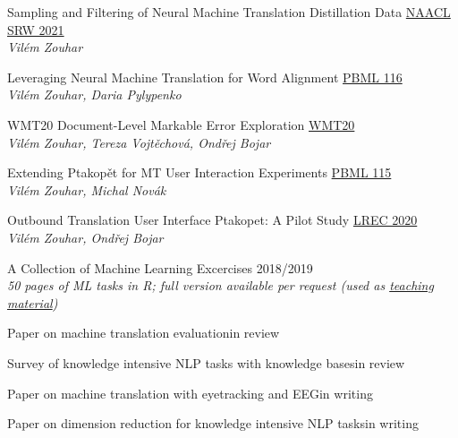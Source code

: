 \documentclass[11pt,a4paper]{article} %
\newcommand{\hSubsectionA}[2]{{#1}\hfill {#2}\hspace{-1cm}}
\newcommand{\hSubsectionB}[3]{
    {#1} \hfill {\footnotesize #2}\hspace{-1cm}\\
    \vspace{-0.2cm} \hspace{-0.17cm}\textit{\footnotesize #3}
    \vspace{0.1cm}
}
\begin{document}
\hSubsectionB
{Sampling and Filtering of Neural Machine Translation Distillation Data}
{\href{https://arxiv.org/pdf/2104.00664.pdf}{NAACL SRW 2021}}
{Vilém Zouhar}

\hSubsectionB
{Leveraging Neural Machine Translation for Word Alignment}
{\href{https://ufal.mff.cuni.cz/pbml/116/art-zouhar-pylypenko.pdf}{PBML 116}}
{Vilém Zouhar, Daria Pylypenko}

\hSubsectionB
{WMT20 Document-Level Markable Error Exploration}
{\href{http://www.statmt.org/wmt20/pdf/2020.wmt-1.41.pdf}{WMT20}}
{Vilém Zouhar, Tereza Vojtěchová, Ondřej Bojar}

\hSubsectionB
{Extending Ptakopět for MT User Interaction Experiments}
{\href{https://ufal.mff.cuni.cz/pbml/115/art-zouhar-novak.pdf}{PBML 115}}
{Vilém Zouhar, Michal Novák}

\hSubsectionB
{Outbound Translation User Interface Ptakopet: A Pilot Study}
{\href{https://www.aclweb.org/anthology/2020.lrec-1.860.pdf}{LREC 2020}}
{Vilém Zouhar, Ondřej Bojar}

\hSubsectionB
{A Collection of Machine Learning Excercises}
{2018/2019}
{50 pages of ML tasks in R; full version available per request (used as \href{http://ufal.mff.cuni.cz/courses/npfl054}{teaching material})}

\hSubsectionA
{Paper on machine translation evaluation}
{in review}

\hSubsectionA
{Survey of knowledge intensive NLP tasks with knowledge bases}
{in review}

\hSubsectionA
{Paper on machine translation with eyetracking and EEG}
{in writing}

\hSubsectionA
{Paper on dimension reduction for knowledge intensive NLP tasks}
{in writing}
\end{document}
